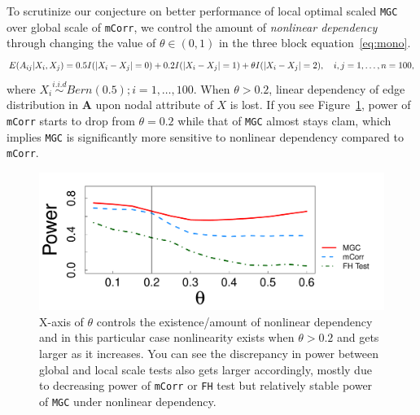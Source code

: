 \documentclass[11pt]{article}
\theoremstyle{definition}
\begin{document}
To scrutinize our conjecture on better performance of local optimal scaled \texttt{MGC} over global scale of \texttt{mCorr}, we control the amount of \textit{nonlinear dependency} through changing the value of $\theta \in (0, 1)$ in the three block equation~\ref{eq:mono}. 
\begin{equation}
E(A_{ij} | X_{i}, X_{j}) = 0.5 I(|X_{i} - X_{j}| = 0) + 0.2 I(|X_{i} - X_{j}| = 1) + \theta I(|X_{i} - X_{j}| = 2), \quad i,j = 1, \ldots, n = 100, 
\label{eq:mono}
\vspace*{-0.4cm}
\end{equation}
where  $X_{i} \overset{i.i.d}{\sim} Bern(0.5); i =1, \ldots, 100$. When $\theta > 0.2$, linear dependency of edge distribution in $\mathbf{A}$ upon nodal attribute of $X$ is lost. If you see Figure~\ref{fig:powerplot}, power of \texttt{mCorr} starts to drop from $\theta = 0.2$ while that of \texttt{MGC} almost stays clam, which implies \texttt{MGC} is significantly more sensitive to nonlinear dependency compared to \texttt{mCorr}.  
\begin{figure}[ht]
	\centering
	\includegraphics[width=0.7\linewidth]{../Figure/mono_simple.pdf}
	\caption{X-axis of $\theta$ controls the existence/amount of nonlinear dependency and in this particular case nonlinearity exists when $\theta > 0.2$ and gets larger as it increases. You can see the discrepancy in power between global and local scale tests also gets larger accordingly, mostly due to decreasing power of \texttt{mCorr} or \texttt{FH} test but relatively stable power of \texttt{MGC} under nonlinear dependency.}
	\label{fig:powerplot}
\end{figure}
\end{document}
